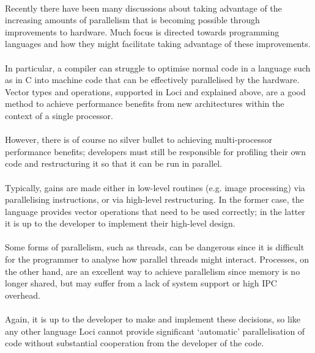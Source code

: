 \documentclass[12pt,twoside,notitlepage]{report}
\begin{document}
\paragraph{}
Recently there have been many discussions about taking advantage of the increasing amounts of parallelism that is becoming possible through improvements to hardware. Much focus is directed towards programming languages and how they might facilitate taking advantage of these improvements.

\paragraph{}
In particular, a compiler can struggle to optimise normal code in a language such as in C into machine code that can be effectively parallelised by the hardware. Vector types and operations, supported in Loci and explained above, are a good method to achieve performance benefits from new architectures within the context of a single processor.

\paragraph{}
However, there is of course no silver bullet to achieving multi-processor performance benefits; developers must still be responsible for profiling their own code and restructuring it so that it can be run in parallel.

\paragraph{}
Typically, gains are made either in low-level routines (e.g. image processing) via parallelising instructions, or via high-level restructuring. In the former case, the language provides vector operations that need to be used correctly; in the latter it is up to the developer to implement their high-level design.

\paragraph{}
Some forms of parallelism, such as threads, can be dangerous since it is difficult for the programmer to analyse how parallel threads might interact. Processes, on the other hand, are an excellent way to achieve parallelism since memory is no longer shared, but may suffer from a lack of system support or high IPC overhead.

\paragraph{}
Again, it is up to the developer to make and implement these decisions, so like any other language Loci cannot provide significant `automatic' parallelisation of code without substantial cooperation from the developer of the code.
\end{document}
